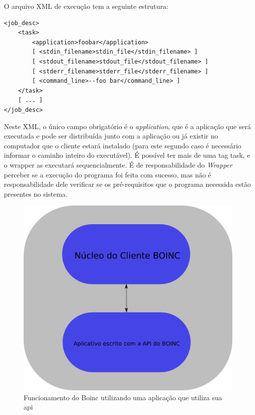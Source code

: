 O arquivo XML de execução tem a seguinte estrutura:

\begin{verbatim}
<job_desc>
    <task>
        <application>foobar</application>
        [ <stdin_filename>stdin_file</stdin_filename> ]
        [ <stdout_filename>stdout_file</stdout_filename> ]
        [ <stderr_filename>stderr_file</stderr_filename> ]
        [ <command_line>--foo bar</command_line> ]
    </task>
    [ ... ]
</job_desc>
\end{verbatim}

Neste XML, o único campo obrigatório é o \emph{application}, que é a aplicação
que será executada e pode ser distribuída junto com a aplicação ou já existir no 
computador que o cliente estará instalado (para este segundo caso é necessário
informar o caminho inteiro do executável). É possível ter mais de uma tag
task, e o wrapper as executará sequencialmente. É de responsabilidade
do \textit{Wrapper} perceber se a execução do programa foi feita com sucesso, 
mas não é responsabilidade dele verificar se os pré-requisitos que o programa necessida
estão presentes no sistema. 


\begin{figure}[!h]
  \centering
  \includegraphics[scale=0.3]{boinc-api.png}
  \caption{Funcionamento do Boinc utilizando uma aplicação que utiliza sua api}
  \label{boinc-api}
\end{figure}


